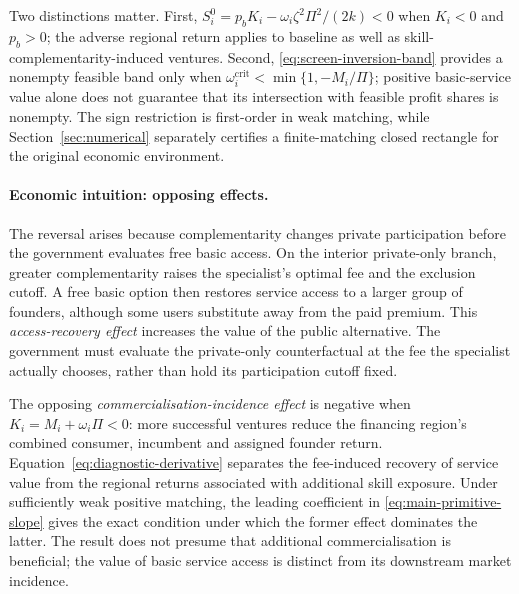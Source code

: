 Two distinctions matter. First, $S_i^0=p_bK_i-\omega_i\zeta^2\Pi^2/(2k)<0$ when $K_i<0$ and $p_b>0$; the adverse regional return applies to baseline as well as skill-complementarity-induced ventures. Second, \eqref{eq:screen-inversion-band} provides a nonempty feasible band only when $\omega_i^{\mathrm{crit}}<\min\{1,-M_i/\Pi\}$; positive basic-service value alone does not guarantee that its intersection with feasible profit shares is nonempty. The sign restriction is first-order in weak matching, while Section~\ref{sec:numerical} separately certifies a finite-matching closed rectangle for the original economic environment.


\paragraph{Economic intuition: opposing effects.}
The reversal arises because complementarity changes private participation before the government evaluates free basic access. On the interior private-only branch, greater complementarity raises the specialist's optimal fee and the exclusion cutoff. A free basic option then restores service access to a larger group of founders, although some users substitute away from the paid premium. This \emph{access-recovery effect} increases the value of the public alternative. The government must evaluate the private-only counterfactual at the fee the specialist actually chooses, rather than hold its participation cutoff fixed.

The opposing \emph{commercialisation-incidence effect} is negative when $K_i=M_i+\omega_i\Pi<0$: more successful ventures reduce the financing region's combined consumer, incumbent and assigned founder return. Equation~\eqref{eq:diagnostic-derivative} separates the fee-induced recovery of service value from the regional returns associated with additional skill exposure. Under sufficiently weak positive matching, the leading coefficient in \eqref{eq:main-primitive-slope} gives the exact condition under which the former effect dominates the latter. The result does not presume that additional commercialisation is beneficial; the value of basic service access is distinct from its downstream market incidence.

